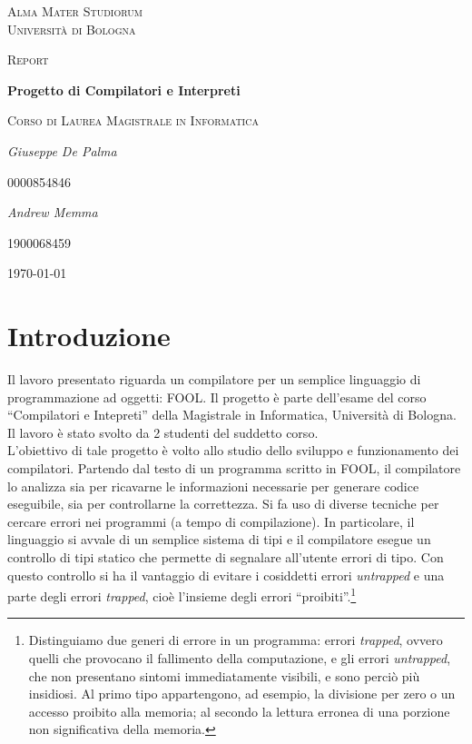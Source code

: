 \documentclass{scrreprt}
\begin{document}
\begin{titlepage}
	\centering
	{\scshape\LARGE Alma Mater Studiorum\\Università di Bologna \par}
	\vspace{1cm}
	{\scshape\Large Report\par}
	\vspace{1.5cm}
    {\huge\bfseries Progetto di Compilatori e Interpreti\par}
    \vspace{0.5cm}
    {\scshape\Large Corso di Laurea Magistrale in Informatica\par}
	\vspace{2cm}
    {\Large\itshape Giuseppe De Palma\par}
    {\Large 0000854846\par}
	\vspace{0.5cm}    
    {\Large\itshape Andrew Memma\par}
    {\Large1900068459\par}
    \vfill

	{\large \today\par}
\end{titlepage}

\tableofcontents

\chapter{Introduzione}
Il lavoro presentato riguarda un compilatore per un semplice linguaggio di programmazione ad oggetti: FOOL. Il progetto è parte dell'esame del corso ``Compilatori e Intepreti'' della Magistrale in Informatica, Università di Bologna. Il lavoro è stato svolto da 2 studenti del suddetto corso.\\

L'obiettivo di tale progetto è volto allo studio dello sviluppo e funzionamento dei compilatori. Partendo dal testo di un programma scritto in FOOL, il compilatore lo analizza sia per ricavarne le informazioni necessarie per generare codice eseguibile, sia per controllarne la correttezza. Si fa uso di diverse tecniche per cercare errori nei programmi (a tempo di compilazione). In particolare, il linguaggio si avvale di un semplice sistema di tipi e il compilatore esegue un controllo di tipi statico che permette di segnalare all'utente errori di tipo. Con questo controllo si ha il vantaggio di evitare i cosiddetti errori \textit{untrapped} e una parte degli errori \textit{trapped}, cioè l'insieme degli errori ``proibiti''.\footnote{Distinguiamo due generi di errore in un programma: errori \textit{trapped}, ovvero quelli che provocano il fallimento della computazione, e gli errori	\textit{untrapped}, che non	presentano sintomi immediatamente visibili, e sono perciò più insidiosi. Al primo tipo appartengono, ad esempio, la divisione per zero o un accesso proibito alla memoria; al secondo la lettura erronea di una porzione non significativa della memoria.}\\
\end{document}
